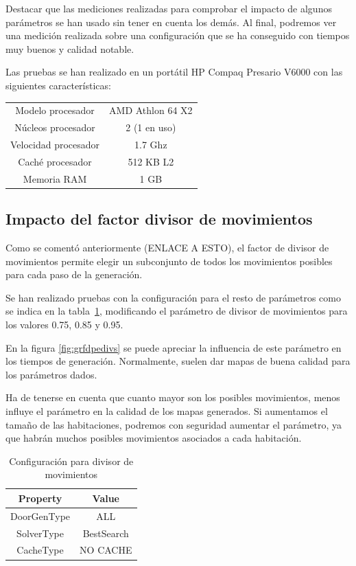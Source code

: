 Destacar que las mediciones realizadas para comprobar el impacto de algunos parámetros se han usado sin tener en cuenta los demás. Al final, podremos ver una medición realizada sobre una configuración que se ha conseguido con tiempos muy buenos y calidad notable.

Las pruebas se han realizado en un portátil HP Compaq Presario V6000 con las siguientes características:

\begin{center}
	\begin{tabular}{ | c | c | }
\hline
Modelo procesador & AMD Athlon 64 X2 \\ 
Núcleos procesador & 2 (1 en uso) \\
Velocidad procesador & 1.7 Ghz \\
Caché procesador & 512 KB L2 \\
Memoria RAM & 1 GB \\
\hline
	\end{tabular}
\end{center}


\subsection{Impacto del factor divisor de movimientos}

Como se comentó anteriormente (ENLACE A ESTO), el factor de divisor de movimientos permite elegir un subconjunto de todos los movimientos posibles para cada paso de la generación.

Se han realizado pruebas con la configuración para el resto de parámetros como se indica en la tabla~\ref{table:cfgdpediv}, modificando el parámetro de divisor de movimientos para los valores 0.75, 0.85 y 0.95.

En la figura \ref{fig:grfdpedivs} se puede apreciar la influencia de este parámetro en los tiempos de generación. Normalmente, suelen dar mapas de buena calidad para los parámetros dados.

Ha de tenerse en cuenta que cuanto mayor son los posibles movimientos, menos influye el parámetro en la calidad de los mapas generados. Si aumentamos el tamaño de las habitaciones, podremos con seguridad aumentar el parámetro, ya que habrán muchos posibles movimientos asociados a cada habitación.

\begin{table}[H]
\begin{center}
	\begin{tabular}{ | c | c | }
\hline
 		Property & Value \\ \hline
DoorGenType & ALL \\ 
SolverType & BestSearch \\ 
CacheType & NO CACHE \\ 
\hline
	\end{tabular}
\end{center}
\caption{Configuración para divisor de movimientos}
\label{table:cfgdpediv}
\end{table}

